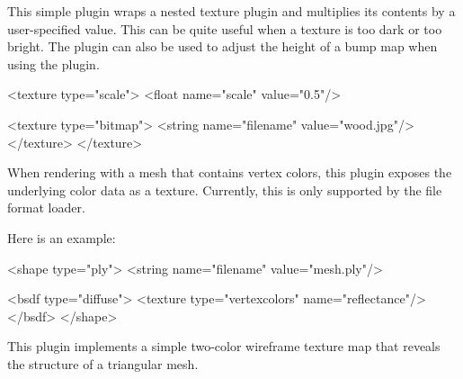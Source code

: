 This simple plugin wraps a nested texture plugin and multiplies its
contents by a user-specified value. This can be quite useful when a
texture is too dark or too bright. The plugin can also be used to adjust
the height of a bump map when using the  plugin.

\begin{xml}[caption=Scaling the contents of a bitmap texture]
<texture type="scale">
    <float name="scale" value="0.5"/>

    <texture type="bitmap">
        <string name="filename" value="wood.jpg"/>
    </texture>
</texture>
\end{xml}
When rendering with a mesh that contains vertex colors,
this plugin exposes the underlying color data as a texture.
Currently, this is only supported by the 
file format loader.

Here is an example:
\begin{xml}[caption=Rendering a PLY file with vertex colors]
<shape type="ply">
    <string name="filename" value="mesh.ply"/>

    <bsdf type="diffuse">
        <texture type="vertexcolors" name="reflectance"/>
    </bsdf>
</shape>
\end{xml}

This plugin implements a simple two-color wireframe texture map
that reveals the structure of a triangular mesh.


